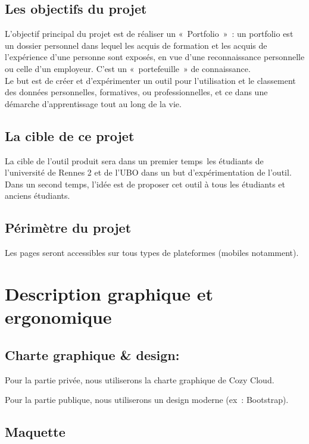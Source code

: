 \subsection{Les objectifs du projet }

L’objectif principal du projet est de réaliser un « Portfolio » : un portfolio est un dossier personnel dans lequel les acquis de formation et les acquis de l’expérience d’une personne sont exposés, en vue d’une reconnaissance personnelle ou celle d’un employeur. C’est un « portefeuille » de connaissance. \\

Le but est de créer et d’expérimenter un outil pour l’utilisation et le classement des données personnelles, formatives, ou professionnelles, et ce dans une démarche d’apprentissage tout au long de la vie.	


\subsection{La cible de ce projet}

La cible de l’outil produit sera dans un premier temps les étudiants de l’université de Rennes 2 et de l’UBO dans un but d’expérimentation de l’outil. 
Dans un second temps, l’idée est de proposer cet outil à tous les étudiants et anciens étudiants.


\subsection{Périmètre du projet}

Les pages seront accessibles sur tous types de plateformes (mobiles notamment).


\section{Description graphique et ergonomique}

\subsection{Charte graphique & design:}

Pour la partie privée, nous utiliserons la charte graphique de Cozy Cloud.

Pour la partie publique, nous utiliserons un design moderne (ex : Bootstrap).

\subsection{Maquette}

